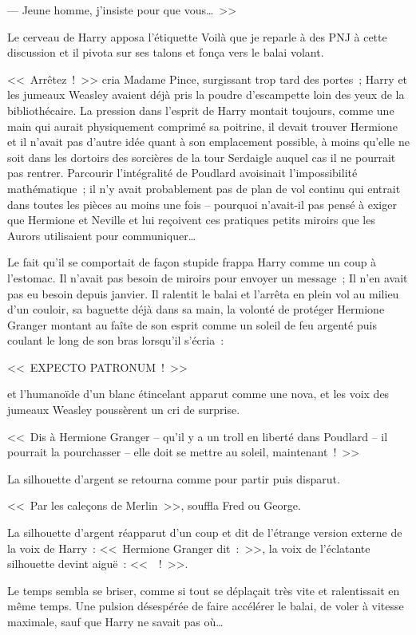 --- Jeune homme, j'insiste pour que vous…~>>

Le cerveau de Harry apposa l'étiquette Voilà que je reparle à des PNJ à cette discussion et il pivota sur ses talons et fonça vers le balai volant.

<<~Arrêtez~!~>> cria Madame Pince, surgissant trop tard des portes~; Harry et les jumeaux Weasley avaient déjà pris la poudre d'escampette loin des yeux de la bibliothécaire. La pression dans l'esprit de Harry montait toujours, comme une main qui aurait physiquement comprimé sa poitrine, il devait trouver Hermione et il n'avait pas d'autre idée quant à son emplacement possible, à moins qu'elle ne soit dans les dortoirs des sorcières de la tour Serdaigle auquel cas il ne pourrait pas rentrer. Parcourir l'intégralité de Poudlard avoisinait l'impossibilité mathématique~; il n'y avait probablement pas de plan de vol continu qui entrait dans toutes les pièces au moins une fois -- pourquoi n'avait-il pas pensé à exiger que Hermione et Neville et lui reçoivent ces pratiques petits miroirs que les Aurors utilisaient pour communiquer…

Le fait qu'il se comportait de façon stupide frappa Harry comme un coup à l'estomac. Il n'avait pas besoin de miroirs pour envoyer un message~; Il n'en avait pas eu besoin depuis janvier. Il ralentit le balai et l'arrêta en plein vol au milieu d'un couloir, sa baguette déjà dans sa main, la volonté de protéger Hermione Granger montant au faîte de son esprit comme un soleil de feu argenté puis coulant le long de son bras lorsqu'il s'écria~:

<<~EXPECTO PATRONUM~!~>>

et l'humanoïde d'un blanc étincelant apparut comme une nova, et les voix des jumeaux Weasley poussèrent un cri de surprise.

<<~Dis à Hermione Granger -- qu'il y a un troll en liberté dans Poudlard -- il pourrait la pourchasser -- elle doit se mettre au soleil, maintenant~!~>>

La silhouette d'argent se retourna comme pour partir puis disparut.

<<~Par les caleçons de Merlin~>>, souffla Fred ou George.

La silhouette d'argent réapparut d'un coup et dit de l'étrange version externe de la voix de Harry~: <<~Hermione Granger dit~:~>>, la voix de l'éclatante silhouette devint aiguë~: <<~~!~>>.

Le temps sembla se briser, comme si tout se déplaçait très vite et ralentissait en même temps. Une pulsion désespérée de faire accélérer le balai, de voler à vitesse maximale, sauf que Harry ne savait pas où…

